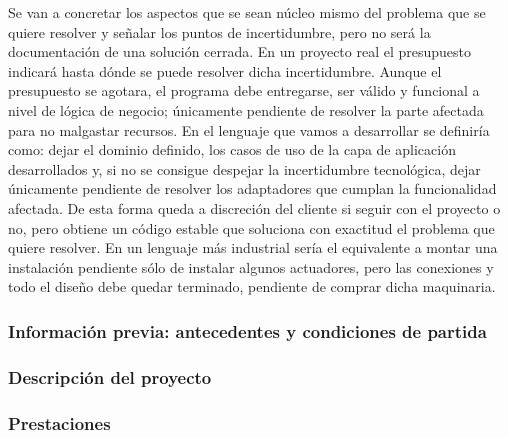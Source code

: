 Se van a concretar los aspectos que se sean núcleo mismo del problema que se quiere resolver y señalar los puntos de incertidumbre, pero no será la documentación de una solución cerrada. En un proyecto real el presupuesto indicará hasta dónde se puede resolver dicha incertidumbre. Aunque el presupuesto se agotara, el programa debe entregarse, ser válido y funcional a nivel de lógica de negocio; únicamente pendiente de resolver la parte afectada para no malgastar recursos. En el lenguaje que vamos a desarrollar se definiría como: dejar el dominio definido, los casos de uso de la capa de aplicación desarrollados y, si no se consigue despejar la incertidumbre tecnológica, dejar únicamente pendiente de resolver los adaptadores que cumplan la funcionalidad afectada. De esta forma queda a discreción del cliente si seguir con el proyecto o no, pero obtiene un código estable que soluciona con exactitud el problema que quiere resolver. En un lenguaje más industrial sería el equivalente a montar una instalación pendiente sólo de instalar algunos actuadores, pero las conexiones y todo el diseño debe quedar terminado, pendiente de comprar dicha maquinaria.

\subsubsection{Información previa: antecedentes y condiciones de partida}
    
\subsubsection{Descripción del proyecto}
    
\subsubsection{Prestaciones}
    
